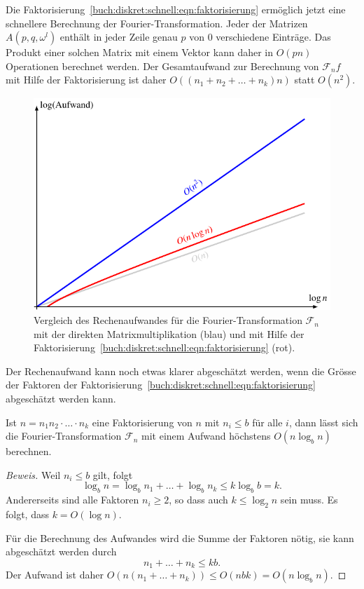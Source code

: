 Die Faktorisierung~\eqref{buch:diskret:schnell:eqn:faktorisierung}
ermöglich jetzt eine schnellere Berechnung der Fourier-Transformation.
Jeder der Matrizen $A(p,q,\omega^l)$ enthält in jeder Zeile genau
$p$ von $0$ verschiedene Einträge.
Das Produkt einer solchen Matrix mit einem Vektor kann daher in 
$O(pn)$ Operationen berechnet werden.
Der Gesamtaufwand zur Berechnung von $\mathscr{F}_nf$ mit Hilfe
der Faktorisierung ist daher 
\(
O((n_1+n_2+\dots+n_k)n)
\)
statt $O(n^2)$.

\begin{figure}
\centering
\includegraphics{chapters/060-diskret/images/log.pdf}
\caption{Vergleich des Rechenaufwandes für die Fourier-Transformation
$\mathscr{F}_n$ mit der direkten Matrixmultiplikation (blau) und
mit Hilfe der 
Faktorisierung~\eqref{buch:diskret:schnell:eqn:faktorisierung}
(rot).
\label{buch:diskret:schnell:fig:log}}
\end{figure}%

Der Rechenaufwand kann noch etwas klarer abgeschätzt werden, wenn 
die Grösse der Faktoren der 
Faktorisierung~\eqref{buch:diskret:schnell:eqn:faktorisierung}
abgeschätzt werden kann.

\begin{satz}
\label{buch:diskret:schnell:satz:aufwand}
Ist $n=n_1n_2\cdot\ldots\cdot n_k$ eine Faktorisierung von $n$
mit $n_i\le b$ für alle $i$, dann lässt sich die Fourier-Transformation
$\mathscr{F}_n$ mit einem Aufwand höchstens $O(n\log_b n)$ berechnen.
\end{satz}

\begin{proof}[Beweis]
Weil $n_i\le b$ gilt, folgt
\[
\log_b n=\log_bn_1+ \ldots +\log_b n_k
\le 
k\log_b b
=
k.
\]
Andererseits sind alle Faktoren $n_i\ge 2$, so dass auch $k\le \log_2 n$
sein muss.
Es folgt, dass $k=O(\log n)$.

Für die Berechnung des Aufwandes wird die Summe der Faktoren nötig,
sie kann abgeschätzt werden durch
\[
n_1+\ldots+n_k
\le
kb.
\]
Der Aufwand ist daher
\(
O(n(n_1+\ldots+n_k))
\le
O(nbk)
=
O(n\log_b n)
\).
\end{proof}

